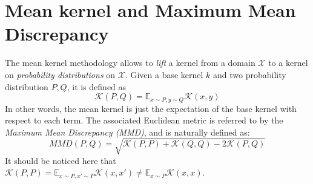 \section{Mean kernel and Maximum Mean Discrepancy } \label{subsec:MMD}
The mean kernel methodology allows to \emph{lift} a kernel from a domain $\mathcal{X}$ to a kernel on \emph{probability distributions} on $\mathcal{X}$. Given a base kernel $k$ and two probability distribution $P,Q$, it is defined as
\begin{equation}\label{eq:mean_kernel}
\mathcal{K}(P,Q) = \mathbb{E}_{x \sim P, y \sim Q} \mathcal{K}(x,y)
\end{equation}
In other words, the mean kernel is just the expectation of the base kernel with respect to each term. The associated Euclidean metric is referred to by the  \emph{Maximum Mean Discrepancy (MMD)}, and is naturally defined as:
\begin{equation}\label{eq:MMD}
MMD(P,Q) = \sqrt{\mathcal{K}(P,P) + \mathcal{K}(Q,Q) - 2\mathcal{K}(P,Q)}
\end{equation}
It should be noticed here that $\mathcal{K}(P,P) = \mathbb{E}_{x \sim P, x' \sim P} \mathcal{K}(x,x') \neq \mathbb{E}_{x \sim P} \mathcal{K}(x,x)$.
